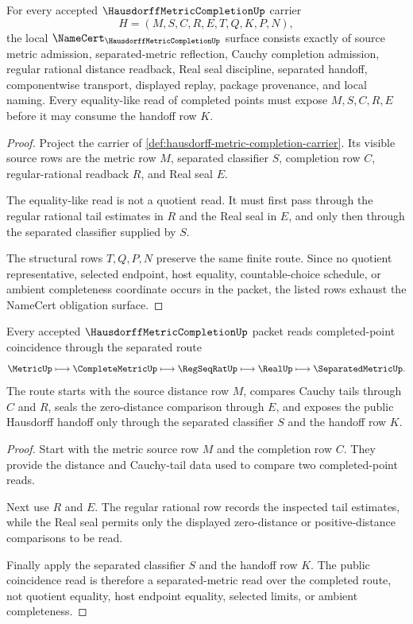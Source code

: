 \begin{theorem}
\label{thm:hausdorff-metric-completion-namecert-obligations}
For every accepted $\HausdorffMetricCompletionUp$ carrier
$$
H=(M,S,C,R,E,T,Q,K,P,N),
$$
the local $\NameCert_{\HausdorffMetricCompletionUp}$ surface consists exactly of source metric admission, separated-metric reflection, Cauchy completion admission, regular rational distance readback, Real seal discipline, separated handoff, componentwise transport, displayed replay, package provenance, and local naming. Every equality-like read of completed points must expose $M,S,C,R,E$ before it may consume the handoff row $K$.
\end{theorem}
\begin{proof}
Project the carrier of \autoref{def:hausdorff-metric-completion-carrier}. Its visible source rows are the metric row $M$, separated classifier $S$, completion row $C$, regular-rational readback $R$, and Real seal $E$.

The equality-like read is not a quotient read. It must first pass through the regular rational tail estimates in $R$ and the Real seal in $E$, and only then through the separated classifier supplied by $S$.

The structural rows $T,Q,P,N$ preserve the same finite route. Since no quotient representative, selected endpoint, host equality, countable-choice schedule, or ambient completeness coordinate occurs in the packet, the listed rows exhaust the NameCert obligation surface.
\end{proof}

\begin{theorem}
\label{thm:hausdorff-metric-completion-separated-route}
Every accepted $\HausdorffMetricCompletionUp$ packet reads completed-point coincidence through the separated route
$$
\MetricUp
\longmapsto
\CompleteMetricUp
\longmapsto
\RegSeqRatUp
\longmapsto
\RealUp
\longmapsto
\SeparatedMetricUp .
$$
The route starts with the source distance row $M$, compares Cauchy tails through $C$ and $R$, seals the zero-distance comparison through $E$, and exposes the public Hausdorff handoff only through the separated classifier $S$ and the handoff row $K$.
\end{theorem}
\begin{proof}
Start with the metric source row $M$ and the completion row $C$. They provide the distance and Cauchy-tail data used to compare two completed-point reads.

Next use $R$ and $E$. The regular rational row records the inspected tail estimates, while the Real seal permits only the displayed zero-distance or positive-distance comparisons to be read.

Finally apply the separated classifier $S$ and the handoff row $K$. The public coincidence read is therefore a separated-metric read over the completed route, not quotient equality, host endpoint equality, selected limits, or ambient completeness.
\end{proof}

